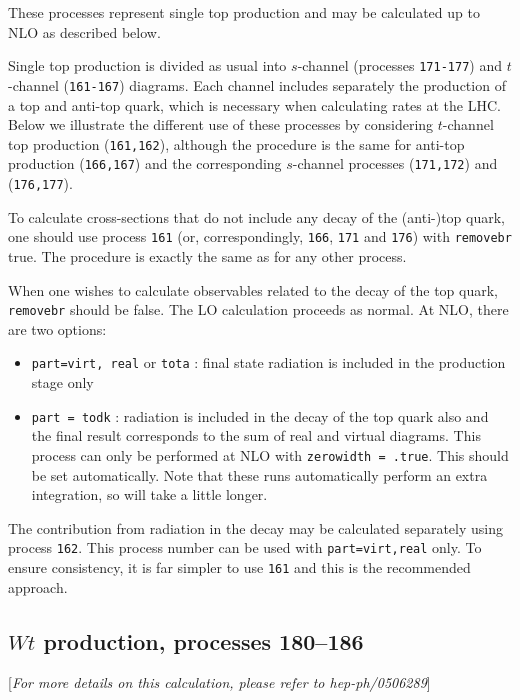 \documentclass[12pt]{article}
\begin{document}
These processes represent single top production and may be calculated up to
NLO as described below.

Single top production is divided as usual into $s$-channel 
(processes {\tt 171-177}) and $t$-channel ({\tt 161-167})
diagrams. Each channel includes separately the production of a top
and anti-top quark, which is necessary when calculating rates at the LHC.
Below we illustrate the different use of these processes by considering
$t$-channel top production ({\tt 161,162}), although the procedure is the same
for anti-top production ({\tt 166,167}) and the corresponding $s$-channel
processes ({\tt 171,172}) and ({\tt 176,177}).

To calculate cross-sections that do not include any decay of the (anti-)top
quark, one should use process {\tt 161}
(or, correspondingly, {\tt 166}, {\tt 171} and {\tt 176}) with {\tt removebr}
true. The procedure is exactly the same
as for any other process.

When one wishes to calculate observables related to the decay of the top
quark, {\tt removebr} should be false.
The LO calculation proceeds as normal. At NLO, there are two options:
\begin{itemize}
\item {\tt part=virt, real} or {\tt tota} : final state radiation is included
in the production stage only
\item {\tt part = todk} : radiation is included in the decay of the top
quark also and the final result corresponds to the sum of real and virtual
diagrams. This process can only be performed at NLO with 
{\tt zerowidth = .true}. This should be set automatically.
Note that these runs automatically perform an extra integration, so
will take a little longer.
\end{itemize}

The contribution from radiation in the decay may be calculated separately using
process {\tt 162}. This process number can be used with {\tt part=virt,real}
only. To ensure consistency, it is far simpler to use {\tt 161}
and this is the recommended approach.

\subsection{$Wt$ production, processes 180--186}
\label{subsec:wt}

\begin{center}
[{\it For more details on this calculation, please refer to hep-ph/0506289}]
\end{center}
\end{document}
